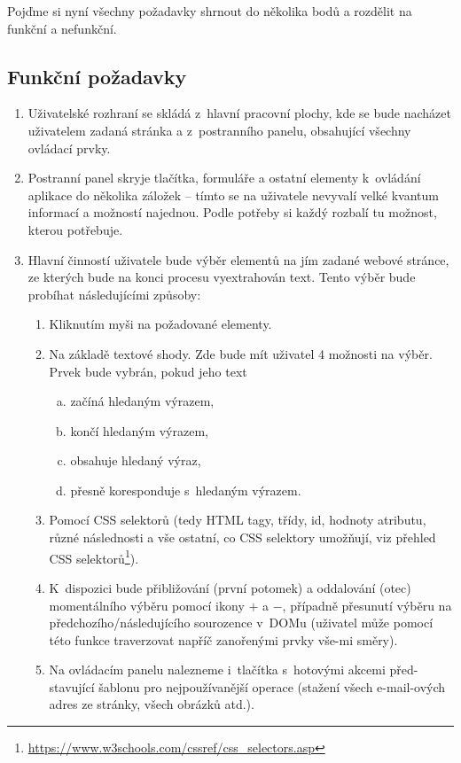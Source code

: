 \documentclass[thesis=B,czech]{FITthesis}[2012/06/26]
\begin{document}
Pojďme si nyní všechny požadavky shrnout do několika bodů a rozdělit na funkční a nefunkční.

\subsection{Funkční požadavky}
\begin{enumerate}[F1)]
	\item Uživatelské rozhraní se skládá z~hlavní pracovní plochy, kde se bude nacházet uživatelem zadaná stránka a z~postranního panelu, obsahující všechny ovládací prvky.
	\item Postranní panel skryje tlačítka, formuláře a ostatní elementy k~ovládání aplikace do několika záložek -- tímto se na uživatele nevyvalí velké kvantum informací a možností najednou. Podle potřeby si každý rozbalí tu možnost, kterou potřebuje.
	\item Hlavní činností uživatele bude výběr elementů na jím zadané webové stránce, ze kterých bude na konci procesu vyextrahován text. Tento výběr bude probíhat následujícími způsoby:
	\begin{enumerate}[F3.1)]
		\item Kliknutím myši na požadované elementy.
		\item Na základě textové shody. Zde bude mít uživatel 4 možnosti na výběr. Prvek bude vybrán, pokud jeho text
		\begin{enumerate}[a)]
			\item začíná hledaným výrazem,
			\item končí hledaným výrazem,
			\item obsahuje hledaný výraz,
			\item přesně koresponduje s~hledaným výrazem.
		\end{enumerate}
		\item Pomocí CSS selektorů (tedy HTML tagy, třídy, id, hodnoty atributu, různé následnosti a vše ostatní, co CSS selektory umožňují, viz přehled CSS selektorů\footnote{\url{https://www.w3schools.com/cssref/css_selectors.asp}}).
		\item K~dispozici bude přibližování (první potomek) a oddalování (otec) momentálního výběru pomocí ikony $+$ a $-$, případně přesunutí výběru na předchozího/následujícího sourozence v~DOMu (uživatel může pomocí této funkce traverzovat napříč zanořenými prvky vše-mi směry).
		\item Na ovládacím panelu nalezneme i~tlačítka s~hotovými akcemi před-stavující šablonu pro nejpoužívanější operace (stažení všech e-mail-ových adres ze stránky, všech obrázků atd.).

\end{enumerate}
\end{enumerate}
\end{document}

